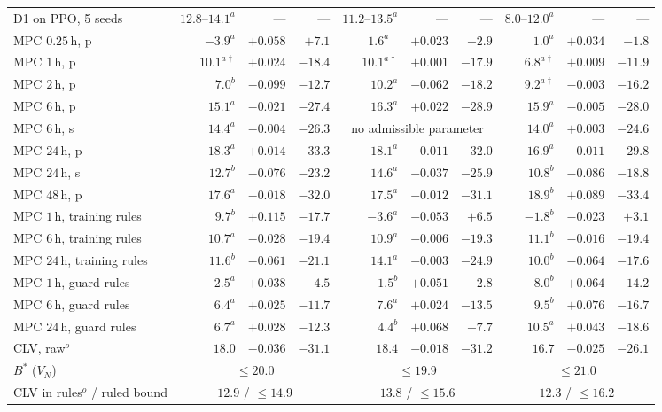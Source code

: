 \documentclass[3p,twocolumn,number]{elsarticle}
\begin{document}
\begin{table}[t]
\begin{tabular*}{\textwidth}{@{\extracolsep{\fill}}lrrrrrrrrr@{}}
D1 on PPO, 5 seeds & $12.8$--$14.1^{a}$ & --- & --- & $11.2$--$13.5^{a}$ & --- & --- & $8.0$--$12.0^{a}$ & --- & --- \\
MPC $0.25\,$h, p & $-3.9^{a}$ & $+0.058$ & $+7.1$ & $1.6^{a\dagger}$ & $+0.023$ & $-2.9$ & $1.0^{a}$ & $+0.034$ & $-1.8$ \\
MPC $1\,$h, p & $10.1^{a\dagger}$ & $+0.024$ & $-18.4$ & $10.1^{a\dagger}$ & $+0.001$ & $-17.9$ & $6.8^{a\dagger}$ & $+0.009$ & $-11.9$ \\
MPC $2\,$h, p & $7.0^{b}$ & $-0.099$ & $-12.7$ & $10.2^{a}$ & $-0.062$ & $-18.2$ & $9.2^{a\dagger}$ & $-0.003$ & $-16.2$ \\
MPC $6\,$h, p & $15.1^{a}$ & $-0.021$ & $-27.4$ & $16.3^{a}$ & $+0.022$ & $-28.9$ & $15.9^{a}$ & $-0.005$ & $-28.0$ \\
MPC $6\,$h, s & $14.4^{a}$ & $-0.004$ & $-26.3$ & \multicolumn{3}{c}{\footnotesize no admissible parameter} & $14.0^{a}$ & $+0.003$ & $-24.6$ \\
MPC $24\,$h, p & $18.3^{a}$ & $+0.014$ & $-33.3$ & $18.1^{a}$ & $-0.011$ & $-32.0$ & $16.9^{a}$ & $-0.011$ & $-29.8$ \\
MPC $24\,$h, s & $12.7^{b}$ & $-0.076$ & $-23.2$ & $14.6^{a}$ & $-0.037$ & $-25.9$ & $10.8^{b}$ & $-0.086$ & $-18.8$ \\
MPC $48\,$h, p & $17.6^{a}$ & $-0.018$ & $-32.0$ & $17.5^{a}$ & $-0.012$ & $-31.1$ & $18.9^{b}$ & $+0.089$ & $-33.4$ \\
MPC $1\,$h, training rules & $9.7^{b}$ & $+0.115$ & $-17.7$ & $-3.6^{a}$ & $-0.053$ & $+6.5$ & $-1.8^{b}$ & $-0.023$ & $+3.1$ \\
MPC $6\,$h, training rules & $10.7^{a}$ & $-0.028$ & $-19.4$ & $10.9^{a}$ & $-0.006$ & $-19.3$ & $11.1^{b}$ & $-0.016$ & $-19.4$ \\
MPC $24\,$h, training rules & $11.6^{b}$ & $-0.061$ & $-21.1$ & $14.1^{a}$ & $-0.003$ & $-24.9$ & $10.0^{b}$ & $-0.064$ & $-17.6$ \\
MPC $1\,$h, guard rules & $2.5^{a}$ & $+0.038$ & $-4.5$ & $1.5^{b}$ & $+0.051$ & $-2.8$ & $8.0^{b}$ & $+0.064$ & $-14.2$ \\
MPC $6\,$h, guard rules & $6.4^{a}$ & $+0.025$ & $-11.7$ & $7.6^{a}$ & $+0.024$ & $-13.5$ & $9.5^{b}$ & $+0.076$ & $-16.7$ \\
MPC $24\,$h, guard rules & $6.7^{a}$ & $+0.028$ & $-12.3$ & $4.4^{b}$ & $+0.068$ & $-7.7$ & $10.5^{a}$ & $+0.043$ & $-18.6$ \\
CLV, raw$^{o}$ & $18.0$ & $-0.036$ & $-31.1$ & $18.4$ & $-0.018$ & $-31.2$ & $16.7$ & $-0.025$ & $-26.1$ \\
$B^{\ast}$ ($V_N$) & \multicolumn{3}{c}{$\le20.0$} & \multicolumn{3}{c}{$\le19.9$} & \multicolumn{3}{c}{$\le21.0$} \\
CLV in rules$^{o}$ / ruled bound & \multicolumn{3}{c}{$12.9$ / $\le14.9$} & \multicolumn{3}{c}{$13.8$ / $\le15.6$} & \multicolumn{3}{c}{$12.3$ / $\le16.2$} \\
\bottomrule
\end{tabular*}
\end{table}
\end{document}
